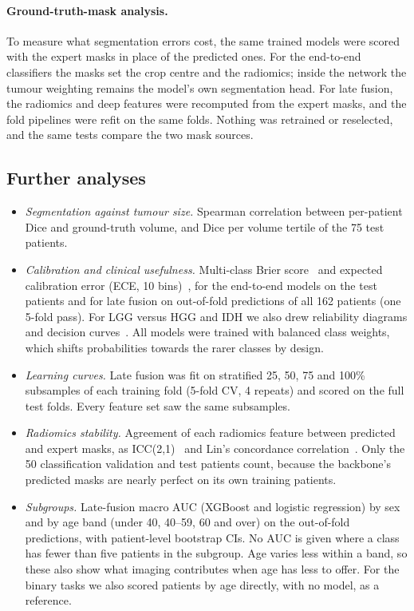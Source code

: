 \documentclass[11pt]{article}
\begin{document}
\paragraph{Ground-truth-mask analysis.} To measure what segmentation errors cost, the same trained models were
scored with the expert masks in place of the predicted ones. For the end-to-end classifiers the masks set the crop
centre and the radiomics; inside the network the tumour weighting remains the model's own segmentation head. For
late fusion, the radiomics and deep features were recomputed from the expert masks, and the fold pipelines were
refit on the same folds. Nothing was retrained or reselected, and the same tests compare the two mask sources.

\subsection{Further analyses}
\begin{itemize}
  \item \emph{Segmentation against tumour size.} Spearman correlation between per-patient Dice and ground-truth
        volume, and Dice per volume tertile of the 75 test patients.
  \item \emph{Calibration and clinical usefulness.} Multi-class Brier score~\cite{brier1950} and expected
        calibration error (ECE, 10 bins)~\cite{guo2017calibration}, for the end-to-end models on the test patients
        and for late fusion on out-of-fold predictions of all 162 patients (one 5-fold pass). For LGG versus HGG and
        IDH we also drew reliability diagrams and decision curves~\cite{vickers2006decision}. All models were trained
        with balanced class weights, which shifts probabilities towards the rarer classes by design.
  \item \emph{Learning curves.} Late fusion was fit on stratified 25, 50, 75 and 100\% subsamples of each training
        fold (5-fold CV, 4 repeats) and scored on the full test folds. Every feature set saw the same subsamples.
  \item \emph{Radiomics stability.} Agreement of each radiomics feature between predicted and expert masks, as
        ICC(2,1)~\cite{shrout1979icc,koo2016icc} and Lin's concordance correlation~\cite{lin1989ccc}. Only the 50
        classification validation and test patients count, because the backbone's predicted masks are nearly
        perfect on its own training patients.
  \item \emph{Subgroups.} Late-fusion macro AUC (XGBoost and logistic regression) by sex and by age band (under 40,
        40--59, 60 and over) on the out-of-fold predictions, with patient-level bootstrap CIs. No AUC is given where a
        class has fewer than five patients in the subgroup. Age varies less within a band, so these also show what
        imaging contributes when age has less to offer. For the binary tasks we also scored patients by age directly,
        with no model, as a reference.
\end{itemize}
\end{document}
